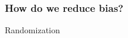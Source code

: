 \documentclass[color=usenames,dvipsnames]{beamer}\usepackage[]{graphicx}\usepackage[]{color}
\begin{document}
\begin{frame}
  \frametitle{How do we reduce bias?}
  \pause
  \begin{center}
    \Huge Randomization
  \end{center}
\end{frame}










\end{document}
